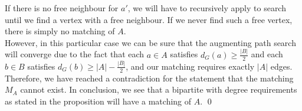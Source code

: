 If there is no free neighbour for $a'$, we will have to recursively apply to search until we find a vertex with a free neighbour. If we never find such a free vertex, there is simply no matching of $A$. \\
\linebreak 
However, in this particular case we can be sure that the augmenting path search will converge due to the fact that each $a \in A$ satisfies $d_G(a) \geq \frac{|B|}{2}$ and each $b \in B$ satisfies $d_G(b) \geq |A| - \frac{|B|}{2}$, and our matching requires exactly $|A|$ edges. \\
\linebreak 
Therefore, we have reached a contradiction for the statement that the matching $M_A$ cannot exist. In conclusion, we see that a bipartite with degree requirements as stated in the proposition will have a matching of $A$. \qed